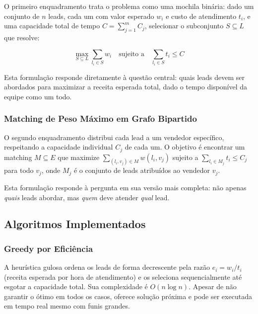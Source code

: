 \documentclass[12pt,a4paper]{article}
\begin{document}
O primeiro enquadramento trata o problema como uma mochila bin\'{a}ria: dado um
conjunto de $n$ leads, cada um com valor esperado $w_i$ e custo de atendimento
$t_i$, e uma capacidade total de tempo $C = \sum_{j=1}^{m} C_j$, selecionar o
subconjunto $S \subseteq L$ que resolve:

\begin{equation}
  \max_{S \subseteq L} \sum_{l_i \in S} w_i
  \quad \text{sujeito a} \quad
  \sum_{l_i \in S} t_i \leq C
  \label{eq:knapsack}
\end{equation}

Esta formula\c{c}\~{a}o responde diretamente \`{a} quest\~{a}o central: quais leads devem ser
abordados para maximizar a receita esperada total, dado o tempo dispon\'{i}vel da
equipe como um todo.

\subsubsection{Matching de Peso M\'{a}ximo em Grafo Bipartido}

O segundo enquadramento distribui cada lead a um vendedor espec\'{i}fico,
respeitando a capacidade individual $C_j$ de cada um. O objetivo \'{e} encontrar
um matching $M \subseteq E$ que maximize $\sum_{(l_i, v_j) \in M} w(l_i, v_j)$
sujeito a $\sum_{l_i \in M_j} t_i \leq C_j$ para todo $v_j$, onde $M_j$ \'{e} o
conjunto de leads atribu\'{i}dos ao vendedor $v_j$.

Esta formula\c{c}\~{a}o responde \`{a} pergunta em sua vers\~{a}o mais completa: n\~{a}o apenas
\emph{quais} leads abordar, mas \emph{quem} deve atender \emph{qual} lead.

\subsection{Algoritmos Implementados}

\subsubsection{Greedy por Efici\^{e}ncia}

A heur\'{i}stica gulosa ordena os leads de forma decrescente pela raz\~{a}o
$e_i = w_i / t_i$ (receita esperada por hora de atendimento) e os seleciona
sequencialmente at\'{e} esgotar a capacidade total. Sua complexidade \'{e} $O(n \log n)$.
Apesar de n\~{a}o garantir o \'{o}timo em todos os casos, oferece solu\c{c}\~{a}o pr\'{o}xima e pode
ser executada em tempo real mesmo com funis grandes.
\end{document}
